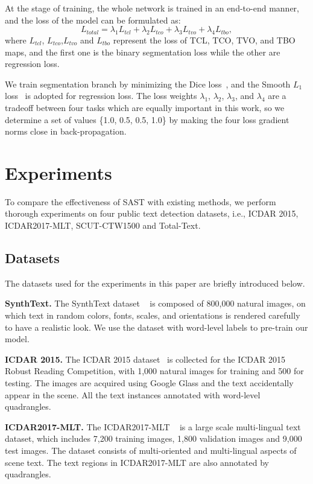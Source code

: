\documentclass[sigconf]{acmart}
\begin{document}
At the stage of training, the whole network is trained in an end-to-end manner, and the loss of the model can be formulated as:
$$L_{total} = {\lambda}_1 L_{tcl} + {\lambda}_2 L_{tco} + {\lambda}_3 L_{tvo} +{\lambda}_4 L_{tbo}, $$
where $L_{tcl}$, $L_{tco}$,$L_{tvo}$ and $L_{tbo}$ represent the loss of TCL, TCO, TVO, and TBO maps, and the first one is the binary segmentation loss while the other are regression loss.




We train segmentation branch by minimizing the Dice loss~\cite{milletari2016v}, and the Smooth $L_1$ loss~\cite{fastrcnn} is adopted for regression loss. The loss weights ${\lambda}_1$, ${\lambda}_2$, ${\lambda}_3$, and ${\lambda}_4$ are a tradeoff between four tasks which are equally important in this work, so we determine a set of values \{1.0, 0.5, 0.5, 1.0\} by making the four loss gradient norms close in back-propagation. 





\section{Experiments}

To compare the effectiveness of SAST with existing methods, we perform thorough experiments on four public text detection datasets, i.e., ICDAR 2015, ICDAR2017-MLT, SCUT-CTW1500 and Total-Text. 

\subsection{Datasets}
The datasets used for the experiments in this paper are briefly introduced below.

\textbf{SynthText.} The SynthText dataset ~\cite{gupta2016synthetic} is composed of 800,000 natural images, on which text in random colors, fonts, scales, and orientations is rendered carefully to have a realistic look. We use the dataset with word-level labels to pre-train our model.

\textbf{ICDAR 2015.} The ICDAR 2015 dataset~\cite{karatzas2015icdar} is collected for the ICDAR 2015 Robust Reading Competition, with 1,000 natural images for training and 500 for testing. The images are acquired using Google Glass and the text accidentally appear in the scene. All the text instances annotated with word-level quadrangles.

\textbf{ICDAR2017-MLT.} The ICDAR2017-MLT ~\cite{nayef2017icdar2017} is a large scale multi-lingual text dataset, which includes 7,200 training images, 1,800 validation images and 9,000 test images. The dataset consists of multi-oriented and multi-lingual aspects of scene text. The text regions in ICDAR2017-MLT are also annotated by quadrangles.
\end{document}
